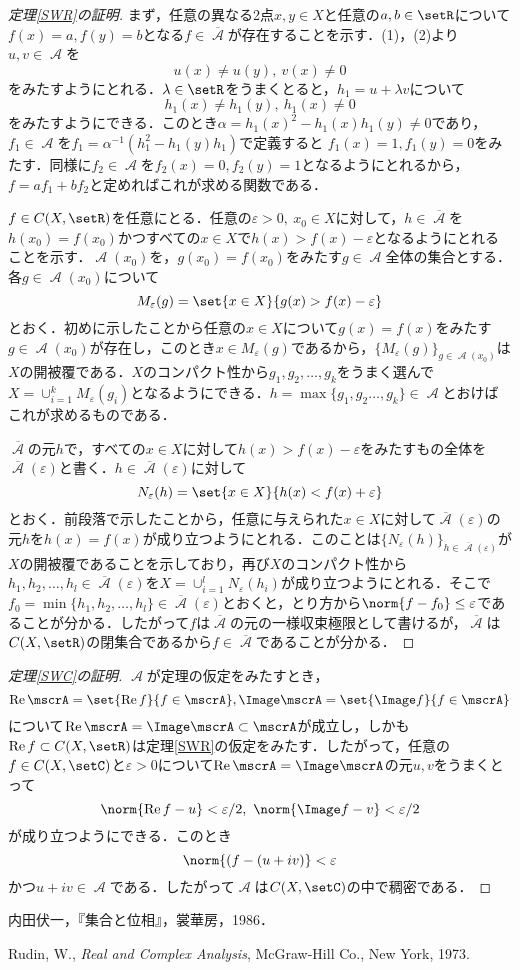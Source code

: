 \documentclass[uplatex]{jsarticle}
\DeclareMathOperator{\Real}{Re}
\begin{document}
\begin{proof}[定理\ref{SWR}の証明]
まず，任意の異なる2点$x,y\in X$と任意の$a,b\in \setR$について$f(x)=a,f(y)=b$となる$f\in \overline{\mscrA}$が存在することを示す．(1)，(2)より$u,v\in \mscrA$を
\[ u(x)\neq u(y),\ v(x)\neq 0 \]
をみたすようにとれる．$\lambda\in \setR$をうまくとると，$h_1=u+\lambda v$について
\[ h_1(x)\neq h_1(y),\ h_1(x)\neq 0 \]
をみたすようにできる．このとき$\alpha = h_1(x)^2-h_1(x)h_1(y)\neq 0$であり，$f_1\in \mscrA$を$f_1=\alpha^{-1}(h_1^2-h_1(y)h_1)$で定義すると
$f_1(x)=1,f_1(y)=0$をみたす．同様に$f_2\in \mscrA$を$f_2(x)=0,f_2(y)=1$となるようにとれるから，$f=af_1+bf_2$と定めればこれが求める関数である．

$f\in C(X,\setR)$を任意にとる．任意の$\varepsilon>0,\ x_0\in X$に対して，$h\in \overline{\mscrA}$を$h(x_0)=f(x_0)$かつすべての$x\in X$で$h(x)>f(x)-\varepsilon$となるようにとれることを示す．$\mscrA(x_0)$を，$g(x_0)=f(x_0)$をみたす$g\in \mscrA$全体の集合とする．各$g\in \mscrA(x_0)$について
\[ M_\varepsilon(g) = \set{x\in X}{g(x)>f(x)-\varepsilon} \]
とおく．初めに示したことから任意の$x\in X$について$g(x)=f(x)$をみたす$g\in \mscrA(x_0)$が存在し，このとき$x\in M_\varepsilon(g)$であるから，$\{M_\varepsilon(g)\}_{g\in\mscrA(x_0)}$は$X$の開被覆である．$X$のコンパクト性から$g_1,g_2,\dots,g_k$をうまく選んで$X=\cup_{i=1}^k M_\varepsilon(g_i)$となるようにできる．$h=\max\{g_1,g_2\dots,g_k\}\in\mscrA$とおけばこれが求めるものである．

$\overline{\mscrA}$の元$h$で，すべての$x\in X$に対して$h(x)>f(x)-\varepsilon$をみたすもの全体を$\overline{\mscrA}(\varepsilon)$と書く．$h\in \overline{\mscrA}(\varepsilon)$に対して
\[ N_\varepsilon(h) = \set{x\in X}{h(x)<f(x)+\varepsilon} \]
とおく．前段落で示したことから，任意に与えられた$x\in X$に対して$\overline{\mscrA}(\varepsilon)$の元$h$を$h(x)=f(x)$が成り立つようにとれる．このことは$\{N_\varepsilon(h)\}_{h\in \overline{\mscrA}(\varepsilon)}$が$X$の開被覆であることを示しており，再び$X$のコンパクト性から$h_1,h_2,\dots,h_l\in \overline{\mscrA}(\varepsilon)$を$X=\cup_{i=1}^l N_\varepsilon(h_i)$が成り立つようにとれる．そこで$f_0=\min\{h_1,h_2,\dots,h_l\}\in \overline{\mscrA}(\varepsilon)$とおくと，とり方から$\norm{f-f_0}\leq \varepsilon$であることが分かる．したがって$f$は$\overline{\mscrA}$の元の一様収束極限として書けるが，$\overline{\mscrA}$は$C(X,\setR)$の閉集合であるから$f\in \overline{\mscrA}$であることが分かる．
\end{proof}

\begin{proof}[定理\ref{SWC}の証明]
$\mscrA$が定理の仮定をみたすとき，
\[ \Real \mscrA  = \set{\Real f}{f\in \mscrA}, \Image \mscrA = \set{\Image f}{f\in \mscrA} \]
について$\Real \mscrA = \Image \mscrA \subset  \mscrA$が成立し，しかも$\Real f\subset C(X,\setR)$は定理\ref{SWR}の仮定をみたす．したがって，任意の$f\in C(X,\setC)$と$\varepsilon>0$について$\Real \mscrA=\Image \mscrA$の元$u,v$をうまくとって
\[ \norm{\Real f-u}<\varepsilon/2,\ \norm{\Image f-v}<\varepsilon/2 \]
が成り立つようにできる．このとき
\[ \norm{(f-(u+iv)} < \varepsilon \]
かつ$u+iv\in \mscrA$である．したがって$\mscrA$は$C(X,\setC)$の中で稠密である．
\end{proof}

\begin{thebibliography}{10}
	\item 内田伏一，『集合と位相』，裳華房，1986．
	\item Rudin, W., \textit{Real and Complex Analysis}, McGraw-Hill Co., New York, 1973.
\end{thebibliography}
\end{document}
